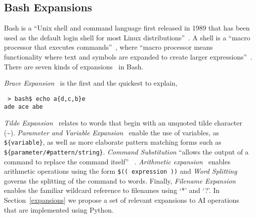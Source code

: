 \subsection{Bash Expansions}\label{bash_expansions}

Bash is a \enquote{Unix shell and command language first released in 1989 that has been used as the default login shell for most Linux distributions}~\cite{bash}. A shell is a \enquote{macro processor that executes commands}~\cite{bash_manual}, where \enquote{macro processor means functionality where text and symbols are expanded to create larger expressions}~\cite{bash_manual}. There are seven kinds of expansions~\cite{bash_expansions_ref} in Bash.

\emph{Brace Expansion}~\cite{brace_expansion} is the first and the quickest to explain,
%
\begin{verbatim}
 > bash$ echo a{d,c,b}e
ade ace abe
\end{verbatim}
%
\emph{Tilde Expansion}~\cite{tilde_expansion} relates to words that begin with an unquoted tilde character (\textasciitilde). \emph{Parameter and Variable Expansion}~\cite{shell_parameter_expansion} enable the use of variables, as \texttt{\$\{variable\}}, as well as more elaborate pattern matching forms such as \texttt{\$\{parameter/\#pattern/string\}}. \emph{Command Substitution} \enquote{allows the output of a command to replace the command itself} ~\cite{command_substitution}. \emph{Arithmetic expansion}~\cite{arithmetic_expansion} enables arithmetic operations using the form \texttt{\$(( expression ))} and \emph{Word Splitting}~\cite{word_splitting} governs the splitting of the command to words. Finally, \emph{Filename Expansion}~\cite{filename_expansion} enables the familiar wildcard reference to filenames using `*' and `?'. In Section~\ref{expansions} we propose a set of relevant expansions to AI operations that are implemented using Python.